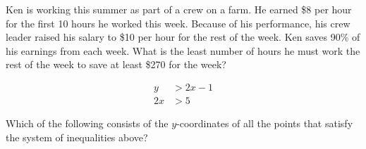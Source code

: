 \vspace{0.75em}


\newpage


\noindent\markforreview

\vspace{1em}

Ken is working this summer as part of a crew on a farm. He earned \$8 per hour for the first 10 hours he worked this week. Because of his performance, his crew leader raised his salary to \$10 per hour for the rest of the week. Ken saves 90\% of his earnings from each week. What is the least number of hours he must work the rest of the week to save at least \$270 for the week?

\vspace{0.75em}


\newpage
\noindent\markforreview


\[
\begin{aligned}
y &> 2x - 1 \\
2x &> 5
\end{aligned}
\]

Which of the following consists of the \( y \)-coordinates of all the points that satisfy the system of inequalities above?

\vspace{0.75em}







